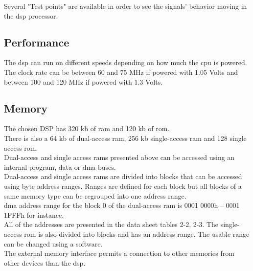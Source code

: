 Several "Test points" are available in order to see the signals' behavior moving in the \gls{dsp} processor.

\subsection{Performance}

The \gls{dsp} can run on different speeds depending on how much the \gls{cpu} is powered. The clock rate can be between 60 and 75 MHz if powered with 1.05 Volts and between 100 and 120 MHz if powered with 1.3 Volts. \\

\subsection{Memory}

The chosen DSP has 320 \gls{kb} of \gls{ram} and 120 \gls{kb} of \gls{rom}. \\
There is also a 64 \gls{kb} of dual-access \gls{ram}, 256 \gls{kb} single-access \gls{ram} and 128 single access \gls{rom}. \\
Dual-access and single access \gls{ram}s presented above can be accessed using an internal program, data or \gls{dma} buses. \\
Dual-access and single access \gls{ram}s are divided into blocks that can be accessed using byte address ranges. Ranges are defined for each block but all blocks of a same memory type can be regrouped into one address range. \\
\gls{dma} address range for the block 0 of the dual-access \gls{ram} is 0001 0000h – 0001 1FFFh for instance. \\
All of the addresses are presented in the data sheet tables 2-2, 2-3.
The single-access \gls{rom} is also divided into blocks and has an address range. The usable range can be changed using a software. \\

The external memory interface permits a connection to other memories from other devices than the \gls{dsp}. 